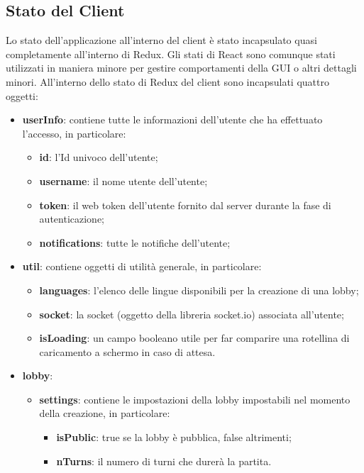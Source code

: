\subsection{Stato del Client}
Lo stato dell'applicazione all'interno del client è stato incapsulato quasi completamente all'interno di Redux.\newline
Gli stati di React sono comunque stati utilizzati in maniera minore per gestire comportamenti della GUI o altri dettagli minori.\newline
All'interno dello stato di Redux del client sono incapsulati quattro oggetti:
\begin{itemize}
    \item \textbf{userInfo}: contiene tutte le informazioni dell'utente che ha effettuato l'accesso, in particolare:
    \begin{itemize}
        \item \textbf{id}: l'Id univoco dell'utente;
        \item \textbf{username}: il nome utente dell'utente;
        \item \textbf{token}: il web token dell'utente fornito dal server durante la fase di autenticazione;
        \item \textbf{notifications}: tutte le notifiche dell'utente;
    \end{itemize}
    \item \textbf{util}: contiene oggetti di utilità generale, in particolare:
    \begin{itemize}
        \item \textbf{languages}: l'elenco delle lingue disponibili per la creazione di una lobby;
        \item \textbf{socket}: la socket (oggetto della libreria socket.io) associata all'utente;
        \item \textbf{isLoading}: un campo booleano utile per far comparire una rotellina di caricamento a schermo in caso di attesa.
    \end{itemize}
    \item \textbf{lobby}:
    \begin{itemize}
        \item \textbf{settings}: contiene le impostazioni della lobby impostabili nel momento della creazione, in particolare:
            \begin{itemize}
                \item \textbf{isPublic}: true se la lobby è pubblica, false altrimenti;
                \item \textbf{nTurns}: il numero di turni che durerà la partita.

\end{itemize}
\end{itemize}
\end{itemize}

